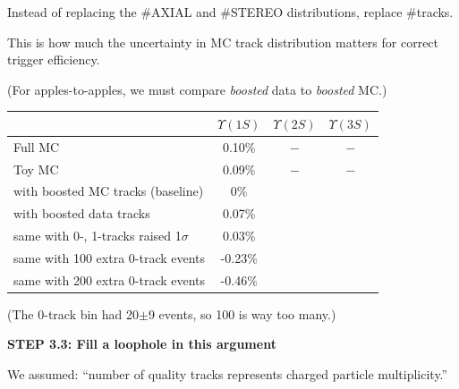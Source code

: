 \documentclass[landscape]{article}
\begin{document}
\vfill

Instead of replacing the \#AXIAL and \#STEREO distributions, replace
\#tracks.

\vfill

This is how much the uncertainty in MC track distribution matters for
correct trigger efficiency.

\vfill

(For apples-to-apples, we must compare {\it boosted} data to {\it boosted} MC.)

\vfill

\begin{center}
  \renewcommand{\arraystretch}{1.25}
  \begin{tabular}{p{12 cm} c c c}
  & \mbox{\hspace{0.5 cm}} $\Upsilon(1S)$ \mbox{\hspace{0.5 cm}} & \mbox{\hspace{0.5 cm}} $\Upsilon(2S)$ \mbox{\hspace{0.5 cm}} & \mbox{\hspace{0.5 cm}} $\Upsilon(3S)$ \mbox{\hspace{0.5 cm}} \\\hline
  Full MC & 0.10\% & $-$ & $-$ \\
  Toy MC & 0.09\% & $-$ & $-$ \\
  with boosted MC tracks (baseline) & 0\% & & \\
  with boosted data tracks & 0.07\% & & \\
  same with 0-, 1-tracks raised 1$\sigma$ & 0.03\% & & \\
  same with 100 extra 0-track events & -0.23\% & & \\
  same with 200 extra 0-track events & -0.46\% & &
  \end{tabular}
\end{center}
\begin{flushright} (The 0-track bin had 20$\pm$9 events, so 100 is way too many.) \end{flushright}

\vfill

\pagebreak

\vspace{1 cm}

{\bf STEP 3.3: Fill a loophole in this argument}

\vfill

We assumed: ``number of quality tracks represents charged particle
multiplicity.''

\vfill
\end{document}
